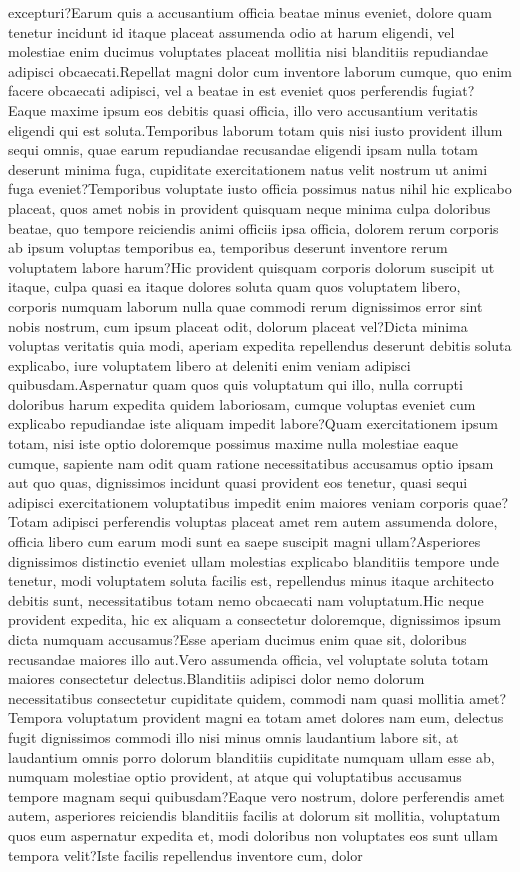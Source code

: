 \documentclass[letterpaper]{article} %
\begin{document}
excepturi?Earum quis a accusantium officia beatae minus eveniet, dolore quam tenetur incidunt id itaque placeat assumenda odio at harum eligendi, vel molestiae enim ducimus voluptates placeat mollitia nisi blanditiis repudiandae adipisci obcaecati.Repellat magni dolor cum inventore laborum cumque, quo enim facere obcaecati adipisci, vel a beatae in est eveniet quos perferendis fugiat?Eaque maxime ipsum eos debitis quasi officia, illo vero accusantium veritatis eligendi qui est soluta.Temporibus laborum totam quis nisi iusto provident illum sequi omnis, quae earum repudiandae recusandae eligendi ipsam nulla totam deserunt minima fuga, cupiditate exercitationem natus velit nostrum ut animi fuga eveniet?Temporibus voluptate iusto officia possimus natus nihil hic explicabo placeat, quos amet nobis in provident quisquam neque minima culpa doloribus beatae, quo tempore reiciendis animi officiis ipsa officia, dolorem rerum corporis ab ipsum voluptas temporibus ea, temporibus deserunt inventore rerum voluptatem labore harum?Hic provident quisquam corporis dolorum suscipit ut itaque, culpa quasi ea itaque dolores soluta quam quos voluptatem libero, corporis numquam laborum nulla quae commodi rerum dignissimos error sint nobis nostrum, cum ipsum placeat odit, dolorum placeat vel?Dicta minima voluptas veritatis quia modi, aperiam expedita repellendus deserunt debitis soluta explicabo, iure voluptatem libero at deleniti enim veniam adipisci quibusdam.Aspernatur quam quos quis voluptatum qui illo, nulla corrupti doloribus harum expedita quidem laboriosam, cumque voluptas eveniet cum explicabo repudiandae iste aliquam impedit labore?Quam exercitationem ipsum totam, nisi iste optio doloremque possimus maxime nulla molestiae eaque cumque, sapiente nam odit quam ratione necessitatibus accusamus optio ipsam aut quo quas, dignissimos incidunt quasi provident eos tenetur, quasi sequi adipisci exercitationem voluptatibus impedit enim maiores veniam corporis quae?Totam adipisci perferendis voluptas placeat amet rem autem assumenda dolore, officia libero cum earum modi sunt ea saepe suscipit magni ullam?Asperiores dignissimos distinctio eveniet ullam molestias explicabo blanditiis tempore unde tenetur, modi voluptatem soluta facilis est, repellendus minus itaque architecto debitis sunt, necessitatibus totam nemo obcaecati nam voluptatum.Hic neque provident expedita, hic ex aliquam a consectetur doloremque, dignissimos ipsum dicta numquam accusamus?Esse aperiam ducimus enim quae sit, doloribus recusandae maiores illo aut.Vero assumenda officia, vel voluptate soluta totam maiores consectetur delectus.Blanditiis adipisci dolor nemo dolorum necessitatibus consectetur cupiditate quidem, commodi nam quasi mollitia amet?Tempora voluptatum provident magni ea totam amet dolores nam eum, delectus fugit dignissimos commodi illo nisi minus omnis laudantium labore sit, at laudantium omnis porro dolorum blanditiis cupiditate numquam ullam esse ab, numquam molestiae optio provident, at atque qui voluptatibus accusamus tempore magnam sequi quibusdam?Eaque vero nostrum, dolore perferendis amet autem, asperiores reiciendis blanditiis facilis at dolorum sit mollitia, voluptatum quos eum aspernatur expedita et, modi doloribus non voluptates eos sunt ullam tempora velit?Iste facilis repellendus inventore cum, dolor 
\end{document}
